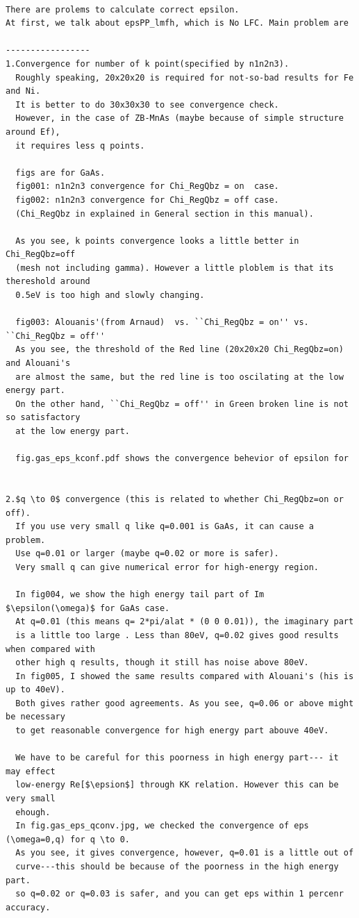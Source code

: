 \documentclass[a4paper,10pt,epsf,fleqn]{article}
\begin{document}
\begin{verbatim}

There are prolems to calculate correct epsilon.
At first, we talk about epsPP_lmfh, which is No LFC. Main problem are 

-----------------
1.Convergence for number of k point(specified by n1n2n3). 
  Roughly speaking, 20x20x20 is required for not-so-bad results for Fe and Ni.
  It is better to do 30x30x30 to see convergence check.
  However, in the case of ZB-MnAs (maybe because of simple structure around Ef),
  it requires less q points.

  figs are for GaAs.
  fig001: n1n2n3 convergence for Chi_RegQbz = on  case.
  fig002: n1n2n3 convergence for Chi_RegQbz = off case.
  (Chi_RegQbz in explained in General section in this manual).

  As you see, k points convergence looks a little better in Chi_RegQbz=off
  (mesh not including gamma). However a little ploblem is that its thereshold around 
  0.5eV is too high and slowly changing.

  fig003: Alouanis'(from Arnaud)  vs. ``Chi_RegQbz = on'' vs. ``Chi_RegQbz = off''
  As you see, the threshold of the Red line (20x20x20 Chi_RegQbz=on) and Alouani's 
  are almost the same, but the red line is too oscilating at the low energy part.
  On the other hand, ``Chi_RegQbz = off'' in Green broken line is not so satisfactory
  at the low energy part. 

  fig.gas_eps_kconf.pdf shows the convergence behevior of epsilon for 
  
   
2.$q \to 0$ convergence (this is related to whether Chi_RegQbz=on or off).
  If you use very small q like q=0.001 is GaAs, it can cause a problem.
  Use q=0.01 or larger (maybe q=0.02 or more is safer). 
  Very small q can give numerical error for high-energy region.

  In fig004, we show the high energy tail part of Im $\epsilon(\omega)$ for GaAs case.
  At q=0.01 (this means q= 2*pi/alat * (0 0 0.01)), the imaginary part
  is a little too large . Less than 80eV, q=0.02 gives good results when compared with
  other high q results, though it still has noise above 80eV.
  In fig005, I showed the same results compared with Alouani's (his is up to 40eV).
  Both gives rather good agreements. As you see, q=0.06 or above might be necessary
  to get reasonable convergence for high energy part abouve 40eV.

  We have to be careful for this poorness in high energy part--- it may effect
  low-energy Re[$\epsion$] through KK relation. However this can be very small
  ehough.
  In fig.gas_eps_qconv.jpg, we checked the convergence of eps (\omega=0,q) for q \to 0.
  As you see, it gives convergence, however, q=0.01 is a little out of 
  curve---this should be because of the poorness in the high energy part.
  so q=0.02 or q=0.03 is safer, and you can get eps within 1 percenr accuracy.


\end{verbatim}
\end{document}
